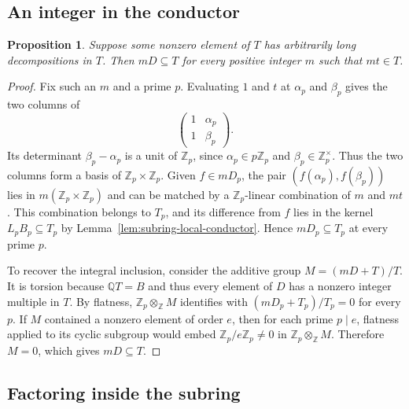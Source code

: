 \documentclass{article}
\newtheorem{proposition}{Proposition}[section]
\theoremstyle{remark}
\begin{document}
\subsection{An integer in the conductor}

\begin{proposition}
    \label{prop:subring-integer-conductor}
    Suppose some nonzero element of $T$ has arbitrarily long decompositions in $T$.
    Then $mD \subseteq T$ for every positive integer $m$ such that $mt \in T$.
\end{proposition}

\begin{proof}
    Fix such an $m$ and a prime $p$.
    Evaluating $1$ and $t$ at $\alpha_p$ and $\beta_p$ gives the two columns of
    \[
        \begin{pmatrix}
            1 & \alpha_p \\
            1 & \beta_p
        \end{pmatrix}.
    \]
    Its determinant $\beta_p - \alpha_p$ is a unit of $\mathbb{Z}_p$, since $\alpha_p \in p\mathbb{Z}_p$ and $\beta_p \in \mathbb{Z}_p^\times$.
    Thus the two columns form a basis of $\mathbb{Z}_p \times \mathbb{Z}_p$.
    Given $f \in mD_p$, the pair $(f(\alpha_p), f(\beta_p))$ lies in $m(\mathbb{Z}_p \times \mathbb{Z}_p)$ and can be matched by a $\mathbb{Z}_p$-linear combination of $m$ and $mt$.
    This combination belongs to $T_p$, and its difference from $f$ lies in the kernel $L_p B_p \subseteq T_p$ by Lemma~\ref{lem:subring-local-conductor}.
    Hence $mD_p \subseteq T_p$ at every prime $p$.

    To recover the integral inclusion, consider the additive group $M = (mD + T)/T$.
    It is torsion because $\mathbb{Q}T = B$ and thus every element of $D$ has a nonzero integer multiple in $T$.
    By flatness, $\mathbb{Z}_p \otimes_{\mathbb{Z}} M$ identifies with $(mD_p + T_p)/T_p = 0$ for every $p$.
    If $M$ contained a nonzero element of order $e$, then for each prime $p \mid e$, flatness applied to its cyclic subgroup would embed $\mathbb{Z}_p/e\mathbb{Z}_p \ne 0$ in $\mathbb{Z}_p \otimes_{\mathbb{Z}} M$.
    Therefore $M = 0$, which gives $mD \subseteq T$.
\end{proof}

\subsection{Factoring inside the subring}
\end{document}
